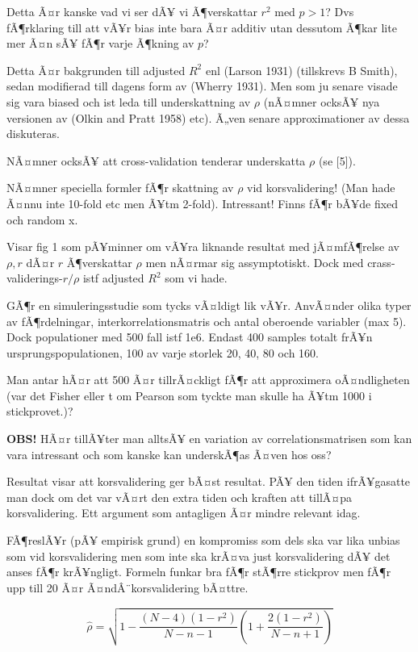 \documentclass[]{article}
\begin{document}
Detta Ã¤r kanske vad vi ser dÃ¥ vi Ã¶verskattar \(r^2\) med \(p> 1\)?
Dvs fÃ¶rklaring till att vÃ¥r bias inte bara Ã¤r additiv utan dessutom
Ã¶kar lite mer Ã¤n sÃ¥ fÃ¶r varje Ã¶kning av \(p\)?

Detta Ã¤r bakgrunden till adjusted \(R^2\) enl (Larson 1931) (tillskrevs
B Smith), sedan modifierad till dagens form av (Wherry 1931). Men som ju
senare visade sig vara biased och ist leda till underskattning av
\(\rho\) (nÃ¤mner ocksÃ¥ nya versionen av (Olkin and Pratt 1958) etc).
Ã„ven senare approximationer av dessa diskuteras.

NÃ¤mner ocksÃ¥ att cross-validation tenderar underskatta \(\rho\) (se
{[}5{]}).

NÃ¤mner speciella formler fÃ¶r skattning av \(\rho\) vid korsvalidering!
(Man hade Ã¤nnu inte 10-fold etc men Ã¥tm 2-fold). Intressant! Finns
fÃ¶r bÃ¥de fixed och random x.

Visar fig 1 som pÃ¥minner om vÃ¥ra liknande resultat med jÃ¤mfÃ¶relse av
\(\rho, r\) dÃ¤r \(r\) Ã¶verskattar \(\rho\) men nÃ¤rmar sig
assymptotiskt. Dock med crass-validerings-\(r/\rho\) istf adjusted
\(R^2\) som vi hade.

GÃ¶r en simuleringsstudie som tycks vÃ¤ldigt lik vÃ¥r. AnvÃ¤nder olika
typer av fÃ¶rdelningar, interkorrelationsmatris och antal oberoende
variabler (max 5). Dock populationer med 500 fall istf 1e6. Endast 400
samples totalt frÃ¥n ursprungspopulationen, 100 av varje storlek 20, 40,
80 och 160.

Man antar hÃ¤r att 500 Ã¤r tillrÃ¤ckligt fÃ¶r att approximera
oÃ¤ndligheten (var det Fisher eller t om Pearson som tyckte man skulle
ha Ã¥tm 1000 i stickprovet.)?

\textbf{OBS!} HÃ¤r tillÃ¥ter man alltsÃ¥ en variation av
correlationsmatrisen som kan vara intressant och som kanske kan
underskÃ¶as Ã¤ven hos oss?

Resultat visar att korsvalidering ger bÃ¤st resultat. PÃ¥ den tiden
ifrÃ¥gasatte man dock om det var vÃ¤rt den extra tiden och kraften att
tillÃ¤pa korsvalidering. Ett argument som antagligen Ã¤r mindre relevant
idag.

FÃ¶reslÃ¥r (pÃ¥ empirisk grund) en kompromiss som dels ska var lika
unbias som vid korsvalidering men som inte ska krÃ¤va just
korsvalidering dÃ¥ det anses fÃ¶r krÃ¥ngligt. Formeln funkar bra fÃ¶r
stÃ¶rre stickprov men fÃ¶r upp till 20 Ã¤r Ã¤ndÂ¨korsvalidering bÃ¤ttre.

\[\hat{\rho} = \sqrt{1 - \frac{(N-4)(1-r^2)}{N-n-1}(1 + \frac{2(1-r^2)}{N-n+1})}\]
\end{document}
